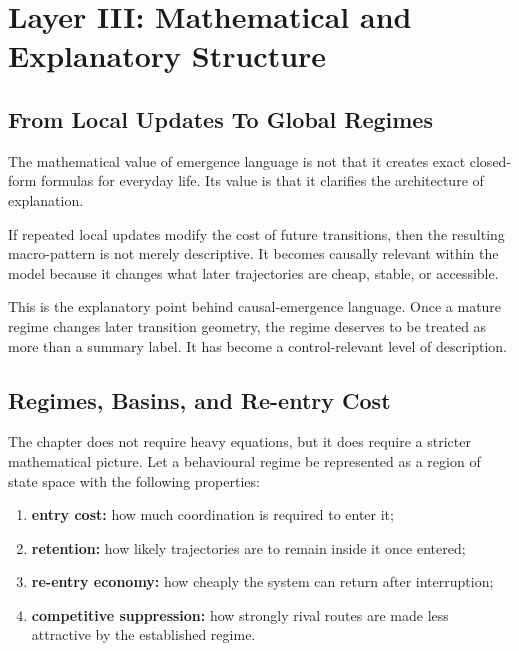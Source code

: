 \section{Layer III: Mathematical and Explanatory Structure}

\subsection{From Local Updates To Global Regimes}

The mathematical value of emergence language is not that it creates exact
closed-form formulas for everyday life. Its value is that it clarifies the
architecture of explanation.

\begin{proposition}
If repeated local updates modify the cost of future transitions, then the
resulting macro-pattern is not merely descriptive. It becomes causally
relevant within the model because it changes what later trajectories are cheap,
stable, or accessible.
\end{proposition}

\begin{discussion}
This is the explanatory point behind causal-emergence language. Once a mature
regime changes later transition geometry, the regime deserves to be treated as
more than a summary label. It has become a control-relevant level of
description.
\end{discussion}

\subsection{Regimes, Basins, and Re-entry Cost}

The chapter does not require heavy equations, but it does require a stricter
mathematical picture. Let a behavioural regime be represented as a region of
state space with the following properties:
\begin{enumerate}[nosep]
  \item \textbf{entry cost:} how much coordination is required to enter it;
  \item \textbf{retention:} how likely trajectories are to remain inside it
        once entered;
  \item \textbf{re-entry economy:} how cheaply the system can return after
        interruption;
  \item \textbf{competitive suppression:} how strongly rival routes are made
        less attractive by the established regime.
\end{enumerate}

